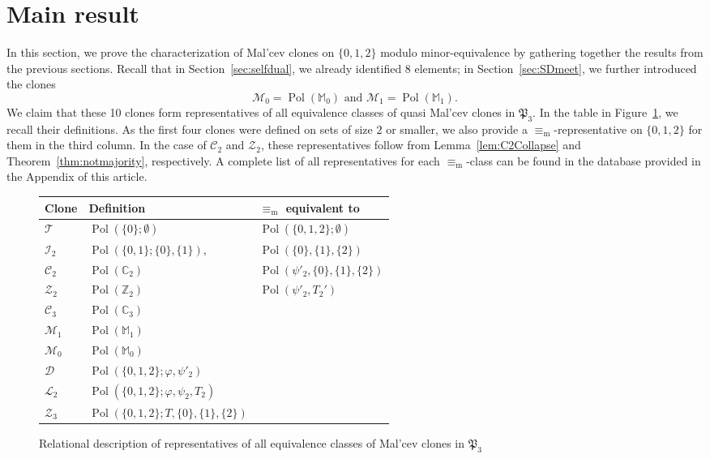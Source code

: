 \documentclass[12pt]{amsart}
\theoremstyle{definition}
\theoremstyle{definition}
\newcommand{\Pthree}{\mathfrak P_{3}}
\newcommand{\struct}[1]{\mathbb{#1}}
\newcommand{\clo}[1]{\mathcal{#1}}
\DeclareMathOperator{\Pol}{Pol}
\newcommand{\minorequivalentto}{\equiv_{\mathrm{m}}}
\begin{document}
\section{Main result}\label{sec:Main}
In this section, we prove the characterization of Mal'cev clones on $\{0,1,2\}$ modulo minor-equivalence by gathering together the results from the previous sections. Recall that in Section~\ref{sec:selfdual}, we already identified 8 elements; in Section~\ref{sec:SDmeet}, we further introduced the clones $$ \clo{M}_0 = \Pol(\struct{M}_0) \text{ and } \clo{M}_1 = \Pol(\struct{M}_1).$$
We claim that these 10 clones form representatives of all equivalence classes of quasi Mal'cev clones in $\Pthree$. In the table in Figure~\ref{figure:definitionclones}, we recall their definitions. As the first four clones were defined on sets of size $2$ or smaller, we also provide a $\minorequivalentto$-representative on $\{0,1,2\}$ for them in the third column. In the case of $\clo{C}_2$ and $\clo{Z}_2$, these representatives follow from Lemma~\ref{lem:C2Collapse} and Theorem~\ref{thm:notmajority}, respectively. A complete list of all representatives for each $\minorequivalentto$-class can be found in the database provided in the Appendix of this article.

\begin{figure}[h]
\begin{tabular}{|l|l|l|}
\hline
Clone & Definition & $\minorequivalentto$ equivalent to \\
\hline
$\clo{T}$ & $\Pol(\{0\};\emptyset)$ & $\Pol(\{0,1,2\};\emptyset)$\\
$\clo{I}_2$ & $\Pol(\{0,1\};\{0\},\{1\})$, & $\Pol(\{0\},\{1\},\{2\})$\\
$\clo{C}_2$ & $\Pol(\mathbb C_2)$ & $\Pol(\psi'_2,\{0\},\{1\},\{2\})$\\
$\clo{Z}_2$ & $\Pol(\struct{Z}_2)$ & $\Pol(\psi'_2,T_2')$\\
$\clo{C}_3$ & $\Pol(\mathbb C_3)$ & \\
$\clo{M}_1$ & $\Pol(\struct{M}_1)$ & \\
$\clo{M}_0$ & $\Pol(\struct{M}_0)$ &\\
$\clo{D}$ & $\Pol(\{0,1,2\};\varphi,\psi'_2)$ & \\
$\clo{L}_2$ &  $\Pol(\{0,1,2\};\varphi,\psi_2,T_2)$ & \\
$\clo{Z}_3$ & $\Pol(\{0,1,2\};T, \{0\},\{1\},\{2\})$  &\\
\hline
\end{tabular}
    \caption{Relational description of representatives of all equivalence classes of Mal'cev clones in $\Pthree$}
    \label{figure:definitionclones}
\end{figure}
\end{document}
